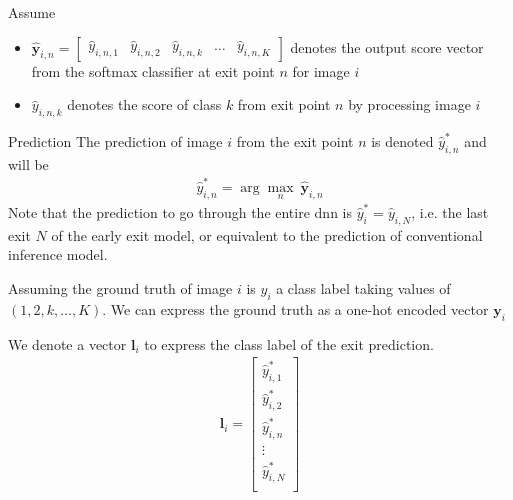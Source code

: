 \begin{enumdescript}
		Assume
		\begin{itemize}
			\item $ \mathbf{\hat{y}}_{i,n} = \left[\begin{array}{ccccc}\hat{y}_{i,n,1} & \hat{y}_{i,n,2} & \hat{y}_{i,n,k} & \dots & \hat{y}_{i,n,K}\end{array}\right] $ denotes the output score vector from the softmax classifier at exit point $ n $ for image $ i $
			\item $ \hat{y}_{i,n,k} $ denotes the score of class $ k $ from exit point $ n $ by processing image $ i $
				
			\end{itemize}
		\begin{enumdescript}
			\item[Prediction] The prediction of image $ i $ from the exit point $ n $ is denoted $ \hat{y}^*_{i,n} $ and will be
			\begin{align}
			\hat{y}^*_{i,n} = \arg \underset{n}{\max}\: \mathbf{\hat{y}}_{i,n}
			\end{align}
			Note that the prediction to go through the entire \gls{dnn} is $ \hat{y}^*_i  = \hat{y}_{i,N} $, i.e. the last exit $ N $ of the early exit model, or equivalent to the prediction of conventional inference model.
			
			Assuming the ground truth of image $ i $ is $ y_i$ a class label taking values of $\left(1, 2, k, \dots, K \right) $. We can express the ground truth as a one-hot encoded vector $ \bm{y}_i $
			
			We denote a vector $ \bm{l}_{i} $ to express the class label of the exit prediction. 
			\begin{align}
				\bm{l}_i = \begin{bmatrix}
				\hat{y}^*_{i,1} \\
				\hat{y}^*_{i,2} \\
				\hat{y}^*_{i,n} \\
				\vdots  \\
				\hat{y}^*_{i,N} \\
				\end{bmatrix}
			\end{align}
			

\end{enumdescript}
\end{enumdescript}
